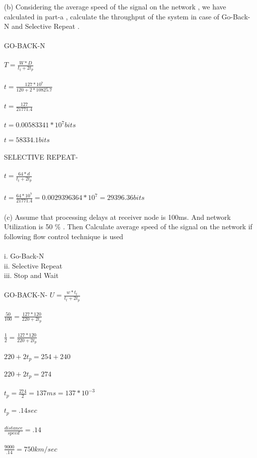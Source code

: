 \documentclass[a4paper,8pt]{article}
\begin{document}
(b) Considering the average speed of the signal on the network , we have calculated in
part-a , calculate the throughput of the system in case of Go-Back-N and Selective
Repeat .\\\\

GO-BACK-N\\\\
$T=\frac{W*D}{t_{t}+2t_{p}}$\\\\
$t=\frac{127*10^{7}}{120+2*10825.7}$\\\\
$t=\frac{127}{21771.4}$\\\\
$t=0.00583341*10^{7} bits$\\\\
$t=58334.1 bits$\\\\
SELECTIVE REPEAT-\\\\
$t=\frac{64*d}{t_{t}+2t_{p}}$\\\\
$t=\frac{64*10^{7}}{21771.4}=0.0029396364*10^{7}=29396.36 bits$\\\\

(c) Assume that processing delays at receiver node is 100ms. And network Utilization
is 50 \% . Then Calculate average speed of the signal on the network if following flow
control technique is used\\\\
i. Go-Back-N\\
ii. Selective Repeat\\
iii. Stop and Wait\\\\

GO-BACK-N-
$U=\frac{w*t_{t}}{t_{t}+2t_{p}}$\\\\
$\frac{50}{100}=\frac{127*120}{220+2t_{p}}$\\\\
$\frac{1}{2}=\frac{127*120}{220+2t_{p}}$\\\\
$220+2t_{p}=254+240$\\\\
$220+2t_{p}=274$\\\\
$t_{p}=\frac{274}{2}=137 ms =137*10^{-3}$\\\\
$t_{p}=.14 sec$\\\\
$\frac{distance}{speed}=.14$\\\\
$\frac{9000}{.14}=750 km/sec$\\\\
\end{document}
